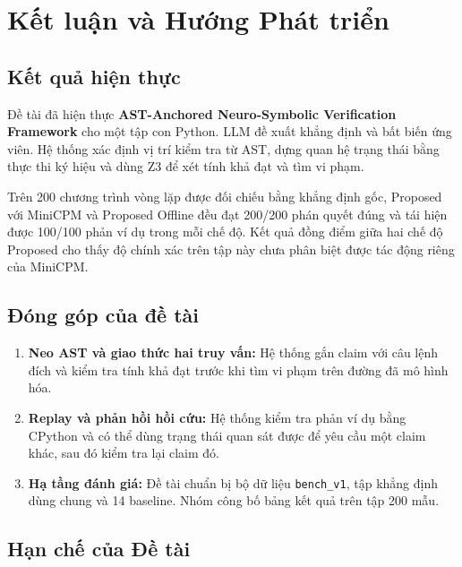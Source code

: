 \chapter{Kết luận và Hướng Phát triển}
\label{ch:conclusion}

\section{Kết quả hiện thực}
\label{sec:conclusion_summary}

Đề tài đã hiện thực \textbf{AST-Anchored Neuro-Symbolic Verification Framework} cho một tập con Python. LLM đề xuất khẳng định và bất biến ứng viên. Hệ thống xác định vị trí kiểm tra từ AST, dựng quan hệ trạng thái bằng thực thi ký hiệu và dùng Z3 để xét tính khả đạt và tìm vi phạm.

Trên 200 chương trình vòng lặp được đối chiếu bằng khẳng định gốc, Proposed với MiniCPM và Proposed Offline đều đạt 200/200 phán quyết đúng và tái hiện được 100/100 phản ví dụ trong mỗi chế độ. Kết quả đồng điểm giữa hai chế độ Proposed cho thấy độ chính xác trên tập này chưa phân biệt được tác động riêng của MiniCPM.

\section{Đóng góp của đề tài}
\label{sec:contributions_highlight}

\begin{enumerate}
    \item \textbf{Neo AST và giao thức hai truy vấn:} Hệ thống gắn claim với câu lệnh đích và kiểm tra tính khả đạt trước khi tìm vi phạm trên đường đã mô hình hóa.
    \item \textbf{Replay và phản hồi hồi cứu:} Hệ thống kiểm tra phản ví dụ bằng CPython và có thể dùng trạng thái quan sát được để yêu cầu một claim khác, sau đó kiểm tra lại claim đó.
    \item \textbf{Hạ tầng đánh giá:} Đề tài chuẩn bị bộ dữ liệu \texttt{bench\_v1}, tập khẳng định dùng chung và 14 baseline. Nhóm công bố bảng kết quả trên tập 200 mẫu.
\end{enumerate}

\section{Hạn chế của Đề tài}
\label{sec:limitations}

